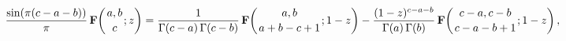 \[\frac{\mathop{\sin\/}\nolimits\!\left(\pi(c-a-b)\right)}{\pi}\mathop{\mathbf{F%
}\/}\nolimits\!\left({a,b\atop c};z\right)=\frac{1}{\mathop{\Gamma\/}\nolimits%
\!\left(c-a\right)\mathop{\Gamma\/}\nolimits\!\left(c-b\right)}\mathop{\mathbf%
{F}\/}\nolimits\!\left({a,b\atop a+b-c+1};1-z\right)-\frac{(1-z)^{c-a-b}}{%
\mathop{\Gamma\/}\nolimits\!\left(a\right)\mathop{\Gamma\/}\nolimits\!\left(b%
\right)}\mathop{\mathbf{F}\/}\nolimits\!\left({c-a,c-b\atop c-a-b+1};1-z\right),\]